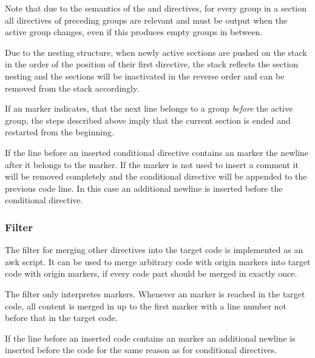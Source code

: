 Note that due to the semantics of the  and  directives, for every group in a section all
directives of preceding groups are relevant and must be output when the active group changes, even if this produces 
empty groups in between.

Due to the nesting structure, when newly active sections are pushed on the stack in the order of the position of their
first directive, the stack reflects the section nesting and the sections will be inactivated in the reverse order and
can be removed from the stack accordingly.

If an  marker indicates, that the next line belongs to a group \textit{before} the active group, the
steps described above imply that the current section is ended and restarted from the beginning.

If the line before an inserted conditional directive contains an  marker the newline after it belongs
to the marker. If the marker is not used to insert a comment it will be removed completely and the conditional
directive will be appended to the previous code line. In this case an additional newline is inserted before 
the conditional directive.

\subsubsection{Filter }

The filter for merging other directives into the target code is implemented as an awk script. It can be used to 
merge arbitrary code with origin markers into target code with origin markers, if every code part should be
merged in exactly once.

The filter only interpretes  markers. Whenever an  marker is reached in the target
code, all content is merged in up to the first  marker with a line number not before that in the target
code.

If the line before an inserted code contains an  marker an additional newline is inserted before 
the code for the same reason as for conditional directives.
